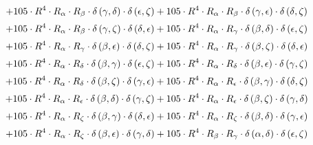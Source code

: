 \begin{subequations}
\begin{gather}
 \\[0.2em] \notag 		 + 105 \cdot R^{4} \cdot R_{\alpha{}} \cdot R_{\beta{}} \cdot \delta{}\left(\gamma{}, \delta{}\right) \cdot \delta{}\left(\epsilon{}, \zeta{}\right)+ 105 \cdot R^{4} \cdot R_{\alpha{}} \cdot R_{\beta{}} \cdot \delta{}\left(\gamma{}, \epsilon{}\right) \cdot \delta{}\left(\delta{}, \zeta{}\right) 
 \\[0.2em] \notag 		 + 105 \cdot R^{4} \cdot R_{\alpha{}} \cdot R_{\beta{}} \cdot \delta{}\left(\gamma{}, \zeta{}\right) \cdot \delta{}\left(\delta{}, \epsilon{}\right)+ 105 \cdot R^{4} \cdot R_{\alpha{}} \cdot R_{\gamma{}} \cdot \delta{}\left(\beta{}, \delta{}\right) \cdot \delta{}\left(\epsilon{}, \zeta{}\right) 
 \\[0.2em] \notag 		 + 105 \cdot R^{4} \cdot R_{\alpha{}} \cdot R_{\gamma{}} \cdot \delta{}\left(\beta{}, \epsilon{}\right) \cdot \delta{}\left(\delta{}, \zeta{}\right)+ 105 \cdot R^{4} \cdot R_{\alpha{}} \cdot R_{\gamma{}} \cdot \delta{}\left(\beta{}, \zeta{}\right) \cdot \delta{}\left(\delta{}, \epsilon{}\right) 
 \\[0.2em] \notag 		 + 105 \cdot R^{4} \cdot R_{\alpha{}} \cdot R_{\delta{}} \cdot \delta{}\left(\beta{}, \gamma{}\right) \cdot \delta{}\left(\epsilon{}, \zeta{}\right)+ 105 \cdot R^{4} \cdot R_{\alpha{}} \cdot R_{\delta{}} \cdot \delta{}\left(\beta{}, \epsilon{}\right) \cdot \delta{}\left(\gamma{}, \zeta{}\right) 
 \\[0.2em] \notag 		 + 105 \cdot R^{4} \cdot R_{\alpha{}} \cdot R_{\delta{}} \cdot \delta{}\left(\beta{}, \zeta{}\right) \cdot \delta{}\left(\gamma{}, \epsilon{}\right)+ 105 \cdot R^{4} \cdot R_{\alpha{}} \cdot R_{\epsilon{}} \cdot \delta{}\left(\beta{}, \gamma{}\right) \cdot \delta{}\left(\delta{}, \zeta{}\right) 
 \\[0.2em] \notag 		 + 105 \cdot R^{4} \cdot R_{\alpha{}} \cdot R_{\epsilon{}} \cdot \delta{}\left(\beta{}, \delta{}\right) \cdot \delta{}\left(\gamma{}, \zeta{}\right)+ 105 \cdot R^{4} \cdot R_{\alpha{}} \cdot R_{\epsilon{}} \cdot \delta{}\left(\beta{}, \zeta{}\right) \cdot \delta{}\left(\gamma{}, \delta{}\right) 
 \\[0.2em] \notag 		 + 105 \cdot R^{4} \cdot R_{\alpha{}} \cdot R_{\zeta{}} \cdot \delta{}\left(\beta{}, \gamma{}\right) \cdot \delta{}\left(\delta{}, \epsilon{}\right)+ 105 \cdot R^{4} \cdot R_{\alpha{}} \cdot R_{\zeta{}} \cdot \delta{}\left(\beta{}, \delta{}\right) \cdot \delta{}\left(\gamma{}, \epsilon{}\right) 
 \\[0.2em] \notag 		 + 105 \cdot R^{4} \cdot R_{\alpha{}} \cdot R_{\zeta{}} \cdot \delta{}\left(\beta{}, \epsilon{}\right) \cdot \delta{}\left(\gamma{}, \delta{}\right)+ 105 \cdot R^{4} \cdot R_{\beta{}} \cdot R_{\gamma{}} \cdot \delta{}\left(\alpha{}, \delta{}\right) \cdot \delta{}\left(\epsilon{}, \zeta{}\right) 

\end{gather}
\end{subequations}
